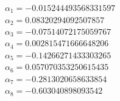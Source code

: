\documentclass[aps,reprint,notitlepage,onecolumn,12pt]{revtex4-2}
\numberwithin{equation}{section}
\begin{document}
\begin{align}
&\alpha_{1}=-0.015244493568331597\nonumber \\
&\alpha_{2}=0.08320294092507857\nonumber \\
&\alpha_{3}=-0.07514072175059767\nonumber \\
&\alpha_{4}=0.002815471666648206\nonumber \\
&\alpha_{5}=-0.14266271433303265\nonumber \\
&\alpha_{6}=0.057070353250615435\nonumber \\
&\alpha_{7}=-0.2813020658633854\nonumber \\
&\alpha_{8}=-0.603040898093542\nonumber
\end{align}
\end{document}
